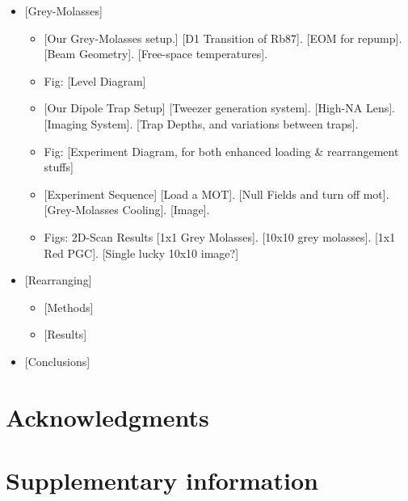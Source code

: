 \documentclass[aps,prl,amsmath,amssymb,groupedaddress,10pt,superscriptaddress,floatfix,twocolumn,showkeys,longbibliography]{revtex4-1} %
\begin{document}
\begin{itemize}
\item{[Grey-Molasses]}
    \begin{itemize}    
    \item{[Our Grey-Molasses setup.]}
        [D1 Transition of Rb87]. [EOM for repump]. [Beam Geometry]. [Free-space temperatures].
    \item{Fig: [Level Diagram]}
    \item{[Our Dipole Trap Setup]}
        [Tweezer generation system]. [High-NA Lens].  [Imaging System].  [Trap Depths, and variations between traps].
    \item{Fig: [Experiment Diagram, for both enhanced loading \& rearrangement stuffs]}
    
    \item{[Experiment Sequence]}
        [Load a MOT]. [Null Fields and turn off mot]. [Grey-Molasses Cooling]. [Image].
    
    \item{Figs: 2D-Scan Results}
        [1x1 Grey Molasses]. [10x10 grey molasses]. [1x1 Red PGC]. [Single lucky 10x10 image?]
    \end{itemize}
\item{[Rearranging]}
    \begin{itemize}
    \item{[Methods]}
    \item{[Results]}
    \end{itemize}
\item{[Conclusions]}

\end{itemize}

\section{Acknowledgments}

%

\newpage

\appendix

\section{Supplementary information}
\label{supplementary}

\newpage
\end{document}
